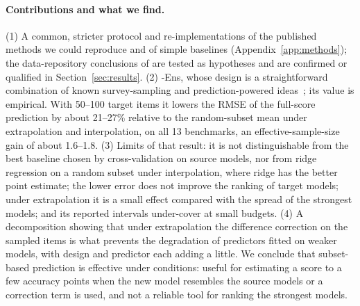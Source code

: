 \paragraph{Contributions and what we find.}
(1) A common, stricter protocol and re-implementations of the published methods we could reproduce and of simple baselines (Appendix~\ref{app:methods}); the data-repository conclusions of \citet{zhang2025benchmark} are tested as hypotheses and are confirmed or qualified in Section~\ref{sec:results}.
(2) \mass{}-Ens, whose design is a straightforward combination of known survey-sampling and prediction-powered ideas~\citep{sarndal1992model,angelopoulos2023ppi}; its value is empirical. With 50--100 target items it lowers the RMSE of the full-score prediction by about 21--27\% relative to the random-subset mean under extrapolation and interpolation, on all 13 benchmarks, an effective-sample-size gain of about 1.6--1.8. 
(3) Limits of that result: it is not distinguishable from the best baseline chosen by cross-validation on source models, nor from ridge regression on a random subset under interpolation, where ridge has the better point estimate; the lower error does not improve the ranking of target models; under extrapolation it is a small effect compared with the spread of the strongest models; and its reported intervals under-cover at small budgets.
(4) A decomposition showing that under extrapolation the difference correction on the sampled items is what prevents the degradation of predictors fitted on weaker models, with design and predictor each adding a little.
We conclude that subset-based prediction is effective under conditions: useful for estimating a score to a few accuracy points when the new model resembles the source models or a correction term is used, and not a reliable tool for ranking the strongest models.
